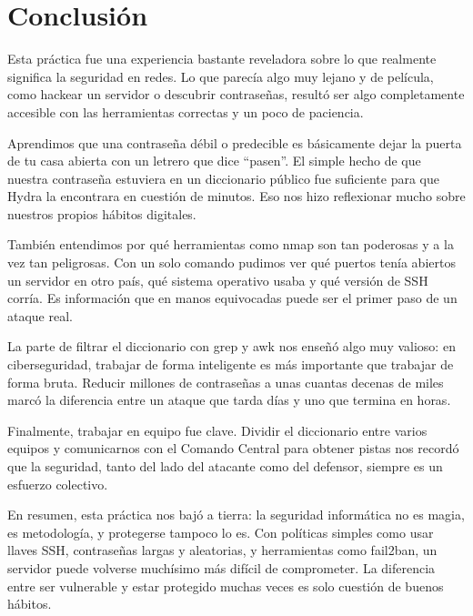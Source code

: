\section{Conclusión}
Esta práctica fue una experiencia bastante reveladora sobre lo que realmente significa la seguridad en redes. Lo que parecía algo muy lejano y de película, como hackear un servidor o descubrir contraseñas, resultó ser algo completamente accesible con las herramientas correctas y un poco de paciencia.

Aprendimos que una contraseña débil o predecible es básicamente dejar la puerta de tu casa abierta con un letrero que dice ``pasen''. El simple hecho de que nuestra contraseña estuviera en un diccionario público fue suficiente para que Hydra la encontrara en cuestión de minutos. Eso nos hizo reflexionar mucho sobre nuestros propios hábitos digitales.

También entendimos por qué herramientas como nmap son tan poderosas y a la vez tan peligrosas. Con un solo comando pudimos ver qué puertos tenía abiertos un servidor en otro país, qué sistema operativo usaba y qué versión de SSH corría. Es información que en manos equivocadas puede ser el primer paso de un ataque real.

La parte de filtrar el diccionario con grep y awk nos enseñó algo muy valioso: en ciberseguridad, trabajar de forma inteligente es más importante que trabajar de forma bruta. Reducir millones de contraseñas a unas cuantas decenas de miles marcó la diferencia entre un ataque que tarda días y uno que termina en horas.

Finalmente, trabajar en equipo fue clave. Dividir el diccionario entre varios equipos y comunicarnos con el Comando Central para obtener pistas nos recordó que la seguridad, tanto del lado del atacante como del defensor, siempre es un esfuerzo colectivo.

En resumen, esta práctica nos bajó a tierra: la seguridad informática no es magia, es metodología, y protegerse tampoco lo es. Con políticas simples como usar llaves SSH, contraseñas largas y aleatorias, y herramientas como fail2ban, un servidor puede volverse muchísimo más difícil de comprometer. La diferencia entre ser vulnerable y estar protegido muchas veces es solo cuestión de buenos hábitos.

